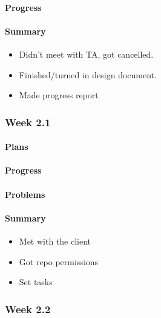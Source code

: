 \documentclass[onecolumn, draftclsnofoot,10pt, compsoc]{article}
\begin{document}
		    \paragraph{Progress} \hfill \break

		    \paragraph{Summary} \hfill \break
		        \begin{itemize}
                    \item Didn't meet with TA, got cancelled. 
                    \item Finished/turned in design document. 
                    \item Made progress report 
                \end{itemize}
                		        
		  \subsubsection{Week 2.1}
			\paragraph{Plans} \hfill \break


			\paragraph{Progress} \hfill \break

			\paragraph{Problems} \hfill \break


			\paragraph{Summary} \hfill \break
			    \begin{itemize}
                    \item Met with the client
                    \item Got repo permissions
                    \item Set tasks
                \end{itemize}

		\subsubsection{Week 2.2}
\end{document}
